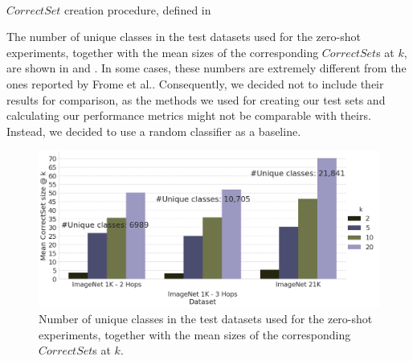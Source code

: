 \documentclass[a4paper]{standalone}
\begin{document}
\begin{algorithm}[h]
    \\
    \caption{$CorrectSet$ creation procedure, defined in \cite{frome2013devise}}\label{alg:CreateCorrectSet}
\end{algorithm}


The number of unique classes in the test datasets used for the zero-shot experiments, together with the mean sizes of the corresponding $CorrectSet$s at $k$, are shown in  and . In some cases, these numbers are extremely different from the ones reported by Frome et al.. Consequently, we decided not to include their results for comparison, as the methods we used for creating our test sets and calculating our performance metrics might not be comparable with theirs. Instead, we decided to use a random classifier as a baseline.

\begin{figure}[ht]
    \centering
    \includegraphics[width=\textwidth]{images/zero_shot_data_info.png}
    \caption{Number of unique classes in the test datasets used for the zero-shot experiments, together with the mean sizes of the corresponding $CorrectSet$s at $k$.}
    \label{fig:ZeroShotDatasetClassesNr}
\end{figure}
\end{document}
